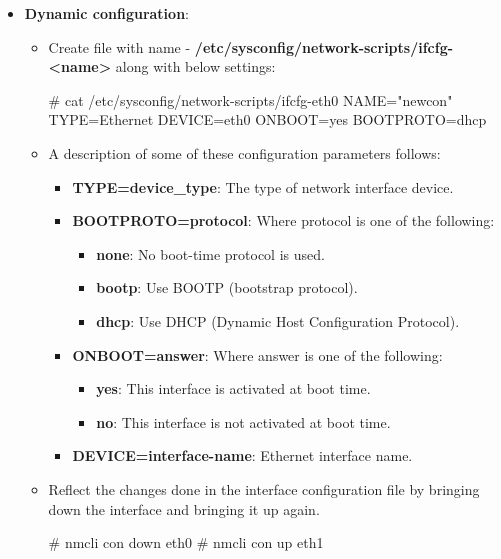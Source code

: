 \begin{flushleft}
\begin{itemize}
	\item \textbf{Dynamic configuration}: 
	\begin{itemize}
		\item Create file with name -  \textbf{/etc/sysconfig/network-scripts/ifcfg-<name>} along with below settings:
		\begin{tcolorbox}[breakable,notitle,boxrule=-0pt,colback=black,colframe=black]
			\color{green}
			\font=9pt
			\# cat /etc/sysconfig/network-scripts/ifcfg-eth0
			\color{white}
			\newline
			NAME="newcon"
			\newline
			TYPE=Ethernet
			\newline
			DEVICE=eth0
			\newline
			ONBOOT=yes
			\newline
			BOOTPROTO=dhcp
			\font=4pt
		\end{tcolorbox}
		\bigskip
		\bigskip
		\item A description of some of these configuration parameters follows:
		\begin{itemize}
		\item \textbf{TYPE=device\_type}: The type of network interface device.
		\item \textbf{BOOTPROTO=protocol}: Where protocol is one of the following:
		\begin{itemize}
			\item \textbf{none}: No boot-time protocol is used.
			\item \textbf{bootp}: Use BOOTP (bootstrap protocol).
			\item \textbf{dhcp}: Use DHCP (Dynamic Host Configuration Protocol).
		\end{itemize}
		\item \textbf{ONBOOT=answer}: Where answer is one of the following:
		\begin{itemize}
			\item \textbf{yes}: This interface is activated at boot time.
			\item \textbf{no}: This interface is not activated at boot time.
		\end{itemize}
		\item \textbf{DEVICE=interface-name}: Ethernet interface name.
	\end{itemize}
	\bigskip
	\bigskip
	\item Reflect the changes done in the interface configuration file by bringing down the interface and bringing it up again.
	\bigskip
	\begin{tcolorbox}[breakable,notitle,boxrule=-0pt,colback=black,colframe=black]
		\color{green}
		\font=9pt
		\# nmcli con down eth0
		\newline
		\# nmcli con up eth1
		\font=4pt
	\end{tcolorbox}		
	\end{itemize}
	

\end{itemize}
\end{flushleft}

